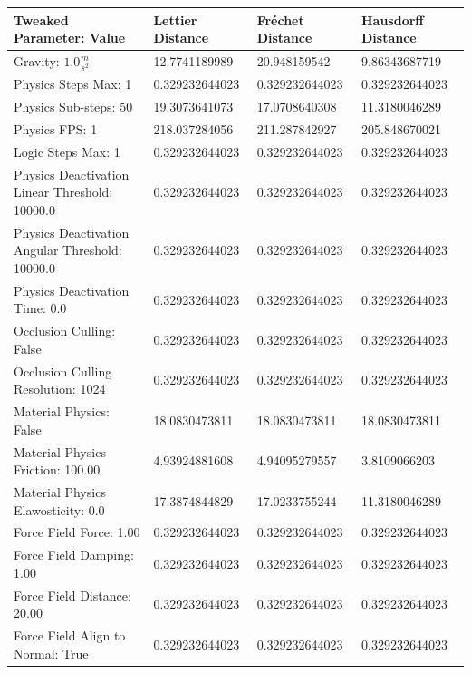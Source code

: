 \begin{table}[htbp]
\centering
\footnotesize
\def\arraystretch{1.1}
\begin{tabular}{ | l || l | l | l | }
\hline
\rowcolor{gray}
Tweaked Parameter: Value & Lettier Distance & Fréchet Distance & Hausdorff Distance \\ \hline
Gravity: $1.0\frac{m}{s^2}$ & 12.7741189989 & 20.948159542 & 9.86343687719 \\ \hline
\rowcolor{cyan}
Physics Steps Max: 1 & 0.329232644023 & 0.329232644023 & 0.329232644023 \\ \hline
Physics Sub-steps: 50 & 19.3073641073 & 17.0708640308 & 11.3180046289 \\ \hline
Physics FPS: 1 & 218.037284056 & 211.287842927 & 205.848670021 \\ \hline
\rowcolor{cyan}
Logic Steps Max: 1 & 0.329232644023 & 0.329232644023 & 0.329232644023 \\ \hline
\rowcolor{cyan}
Physics Deactivation Linear Threshold: 10000.0 & 0.329232644023 & 0.329232644023 & 0.329232644023 \\ \hline
\rowcolor{cyan}
Physics Deactivation Angular Threshold: 10000.0 & 0.329232644023 & 0.329232644023 & 0.329232644023 \\ \hline
\rowcolor{cyan}
Physics Deactivation Time: 0.0 & 0.329232644023 & 0.329232644023 & 0.329232644023 \\ \hline
\rowcolor{cyan}
Occlusion Culling: False & 0.329232644023 & 0.329232644023 & 0.329232644023 \\ \hline
\rowcolor{cyan}
Occlusion Culling Resolution: 1024 & 0.329232644023  & 0.329232644023  & 0.329232644023 \\ \hline
Material Physics: False & 18.0830473811 & 18.0830473811  & 18.0830473811 \\ \hline
Material Physics Friction: 100.00 & 4.93924881608  & 4.94095279557  & 3.8109066203 \\ \hline
Material Physics Elawosticity: 0.0 & 17.3874844829  & 17.0233755244  & 11.3180046289 \\ \hline
\rowcolor{cyan}
Force Field Force: 1.00 & 0.329232644023  & 0.329232644023  & 0.329232644023 \\ \hline
\rowcolor{cyan}
Force Field Damping: 1.00 & 0.329232644023  & 0.329232644023  & 0.329232644023 \\ \hline
\rowcolor{cyan}
Force Field Distance: 20.00 & 0.329232644023  & 0.329232644023  & 0.329232644023 \\ \hline
\rowcolor{cyan}
Force Field Align to Normal: True & 0.329232644023  & 0.329232644023  & 0.329232644023 \\ \hline

\end{tabular}
\end{table}
